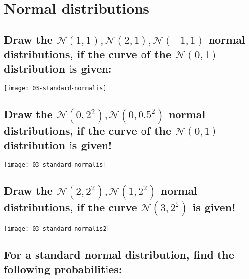 \clearpage
\section{Normal distributions}

\newcommand{\N}{\mathcal{N}}
\subsection{Draw the $\N(1, 1), \N(2, 1), \N(-1, 1)$ normal distributions, if the curve of the $\N(0, 1)$ distribution is given:}

\begin{center}
\texttt{[image: 03-standard-normalis]}
\end{center}


\subsection{Draw the $\N(0, 2^2), \N(0, 0.5^2)$ normal distributions, if the curve of the $\N(0, 1)$ distribution is given!} 

\begin{center}
\texttt{[image: 03-standard-normalis]}
\end{center}

\subsection{Draw the $\N(2, 2^2), \N(1, 2^2)$ normal distributions, if the curve $\N(3, 2^2)$ is given!}
\begin{center}
\texttt{[image: 03-standard-normalis2]}
\end{center}



\subsection{For a standard normal distribution, find the following probabilities:}


